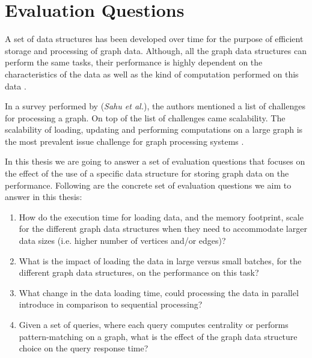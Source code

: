{\section{Evaluation Questions}
\label{sec:EvalQuests}

A set of data structures has been developed over time for the purpose of efficient storage and processing of graph data. Although, all the graph data structures can perform the same tasks, their performance is highly dependent on the characteristics of the data as well as the kind of computation performed on this data \cite{Paradies2017}.

In a survey performed by (\textit{Sahu et al.}), the authors mentioned a list of challenges for processing a graph. On top of the list of challenges came scalability. The scalability of loading, updating and performing computations on a large graph is the most prevalent issue challenge for graph processing systems \cite{sahu2017ubiquity}.

In this thesis we are going to answer a set of evaluation questions that focuses on the effect of the use of a specific data structure for storing graph data on the performance. Following are the concrete set of evaluation questions we aim to answer in this thesis:

\begin{enumerate}
\item How do the execution time for loading data, and the memory footprint, scale for the different graph data structures when they need to accommodate larger data sizes (i.e. higher number of vertices and/or edges)? 
\item What is the impact of loading the data in large versus small batches, for the different graph data structures, on the performance on this task?

\item What change in the data loading time, could processing the data in parallel introduce in comparison to sequential processing?
\item Given a set of queries, where each query computes centrality or performs pattern-matching on a graph, what is the effect of the graph data structure choice on the query response time?%


\end{enumerate}}
